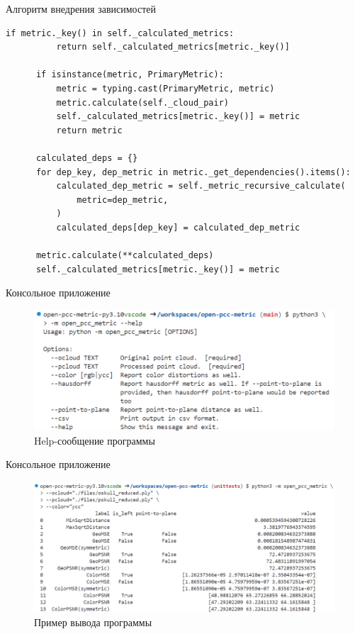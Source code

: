 \documentclass[aspectratio=169]{beamer}
\begin{document}
  \begin{frame}[fragile]{Алгоритм внедрения зависимостей}
    \begin{lstlisting}[caption={
      Алгоритм внедрения зависимостей
    }, label={lst:calculator_recursive_calculate},
    basicstyle=\tiny\ttfamily,
    gobble=6]
      if metric._key() in self._calculated_metrics:
          return self._calculated_metrics[metric._key()]

      if isinstance(metric, PrimaryMetric):
          metric = typing.cast(PrimaryMetric, metric)
          metric.calculate(self._cloud_pair)
          self._calculated_metrics[metric._key()] = metric
          return metric

      calculated_deps = {}
      for dep_key, dep_metric in metric._get_dependencies().items():
          calculated_dep_metric = self._metric_recursive_calculate(
              metric=dep_metric,
          )
          calculated_deps[dep_key] = calculated_dep_metric

      metric.calculate(**calculated_deps)
      self._calculated_metrics[metric._key()] = metric
    \end{lstlisting}
  \end{frame}

  \begin{frame}{Консольное приложение}
    \begin{figure}[H]
        \centering
        \includegraphics[width=0.9\linewidth]{assets/open_pcc_metric_help.png}
        \caption{Help-сообщение программы}
        \label{img:pcc_metric_help}
    \end{figure}
  \end{frame}

  \begin{frame}{Консольное приложение}
    \begin{figure}[H]
        \centering
        \includegraphics[width=0.9\linewidth]{assets/open_pcc_metric_output.png}
        \caption{Пример вывода программы}
        \label{img:pcc_metric_output}
    \end{figure}
  \end{frame}
\end{document}
